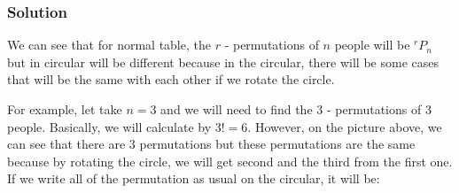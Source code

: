 \documentclass{article}
\theoremstyle{mytheoremstyle}
\theoremstyle{mytheoremstyle}
\theoremstyle{myproblemstyle}
\begin{document}
    \subsubsection*{Solution}
    We can see that for normal table, the \(r\) - permutations of \(n\) people will be \(^rP_n\) but in circular
    will be different because in the circular, there will be some cases that will be the same with each other if we rotate
    the circle. \\ 
    \begin{center}
        \space
        \space
    \end{center}
    For example, let take \(n = 3\) and we will need to find the 3 - permutations of 3 people. Basically, we will calculate by
    \(3! = 6\). However, on the picture above, we can see that there are 3 permutations but these permutations are the same
    because by rotating the circle, we will get second and the third from the first one. If we write all of the permutation as usual on
    the circular, it will be: \\ 
\end{document}
